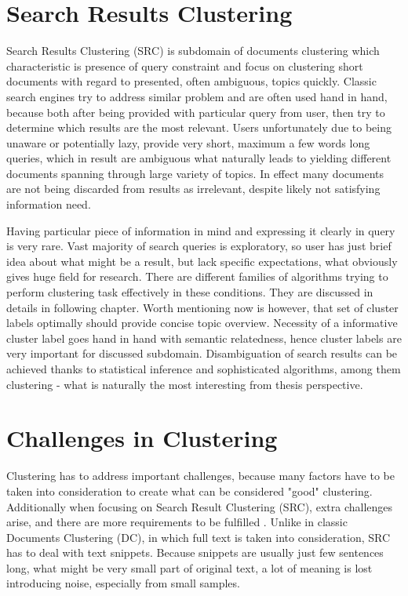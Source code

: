 \documentclass[a4paper, 12pt, oneside]{Thesis} %
\begin{document}
\section{Search Results Clustering} Search Results Clustering (SRC) is subdomain of documents clustering which characteristic is presence of query constraint and focus on clustering short documents with regard to presented, often ambiguous, topics quickly. Classic search engines try to address similar problem and are often used hand in hand, because both after being provided with particular query from user, then try to determine which results are the most relevant. Users unfortunately due to being unaware or potentially lazy, provide very short, maximum a few words long queries, which in result are ambiguous what naturally leads to yielding different documents spanning through large variety of topics. In effect many documents are not being discarded from results as irrelevant, despite likely not satisfying information need.

Having particular piece of information in mind and expressing it clearly in query is very rare. Vast majority of search queries is exploratory, so user has just brief idea about what might be a result, but lack specific expectations, what obviously gives huge field for research. There are different families of algorithms trying to perform clustering task effectively in these conditions. They are discussed in details in following chapter. Worth mentioning now is however, that set of cluster labels optimally should provide concise topic overview. Necessity of a informative cluster label goes hand in hand with semantic relatedness, hence cluster labels are very important for discussed subdomain. Disambiguation of search results can be achieved thanks to statistical inference and sophisticated algorithms, among them clustering - what is naturally the most interesting from thesis perspective.

\section{Challenges in Clustering} Clustering has to address important challenges, because many factors have to be taken into consideration to create what can be considered "good" clustering. Additionally when focusing on Search Result Clustering (SRC), extra challenges arise, and there are more requirements to be fulfilled \cite{weiss2002introduction}. Unlike in classic Documents Clustering (DC), in which full text is taken into consideration, SRC has to deal with text snippets. Because snippets are usually just few sentences long, what might be very small part of original text, a lot of meaning is lost introducing noise, especially from small samples.
\end{document}
